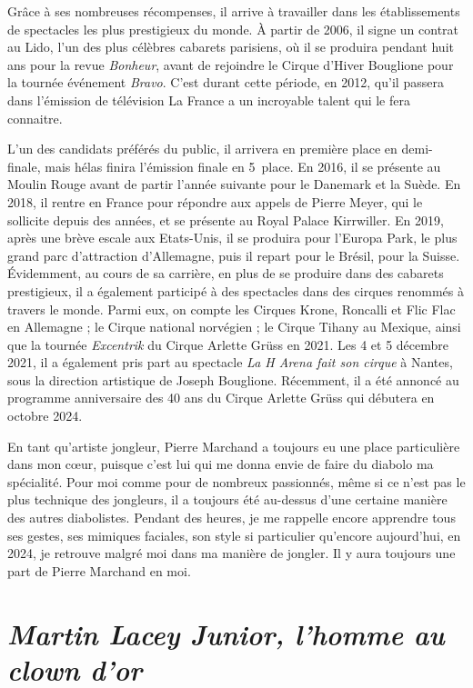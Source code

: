 Grâce à ses nombreuses récompenses, il arrive à travailler dans les établissements de spectacles les plus prestigieux du monde. À partir de 2006, il signe un contrat au Lido, l'un des plus célèbres cabarets parisiens, où il se produira pendant huit ans pour la revue \textit{Bonheur}, avant de rejoindre le Cirque d'Hiver Bouglione pour la tournée événement \textit{Bravo}. C'est durant cette période, en 2012, qu'il passera dans l'émission de télévision La France a un incroyable talent qui le fera connaitre.

L'un des candidats préférés du public, il arrivera en première place en demi-finale, mais hélas finira l'émission finale en 5\ieme~place. En 2016, il se présente au Moulin Rouge avant de partir l'année suivante pour le Danemark et la Suède. En 2018, il rentre en France pour répondre aux appels de Pierre Meyer, qui le sollicite depuis des années, et se présente au Royal Palace Kirrwiller. En 2019, après une brève escale aux Etats-Unis, il se produira pour l'Europa Park, le plus grand parc d'attraction d'Allemagne, puis il repart pour le Brésil, pour la Suisse. Évidemment, au cours de sa carrière, en plus de se produire dans des cabarets prestigieux, il a également participé à des spectacles dans des cirques renommés à travers le monde. Parmi eux, on compte les Cirques Krone, Roncalli et Flic Flac en Allemagne ; le Cirque national norvégien ; le Cirque Tihany au Mexique, ainsi que la tournée \textit{Excentrik} du Cirque Arlette Grüss en 2021. Les 4 et 5 décembre 2021, il a également pris part au spectacle \textit{La H Arena fait son cirque} à Nantes, sous la direction artistique de Joseph Bouglione. Récemment, il a été annoncé au programme anniversaire des 40 ans du Cirque Arlette Grüss qui débutera en octobre 2024. 

En tant qu'artiste jongleur, Pierre Marchand a toujours eu une place particulière dans mon cœur, puisque c'est lui qui me donna envie de faire du diabolo ma spécialité. Pour moi comme pour de nombreux passionnés, même si ce n’est pas le plus technique des jongleurs, il a toujours été au-dessus d'une certaine manière des autres diabolistes. Pendant des heures, je me rappelle encore apprendre tous ses gestes, ses mimiques faciales, son style si particulier qu'encore aujourd'hui, en 2024, je retrouve malgré moi dans ma manière de jongler. Il y aura toujours une part de Pierre Marchand en moi.

\section*{\textit{Martin Lacey Junior, l'homme au clown d'or}}
{}

